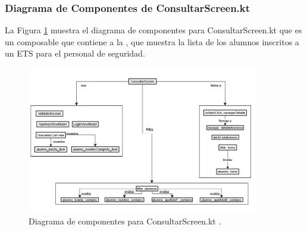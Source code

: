 \newpage

\subsubsection{Diagrama de Componentes de ConsultarScreen.kt}

La Figura \ref{fig:Componentes_4} muestra el diagrama de componentes para ConsultarScreen.kt que es un composable que contiene a la  , que muestra la lista de los alumnos inscritos a un ETS para el personal de seguridad.

\begin{figure}[htbp!]
	\begin{center}
		\includegraphics[width=0.9\textwidth]{DiagramasMoviles/DCM (16)}
		\caption{Diagrama de componentes para ConsultarScreen.kt .}
		\label{fig:Componentes_4}
	\end{center}
\end{figure}

\newpage

\newpage




\newpage




